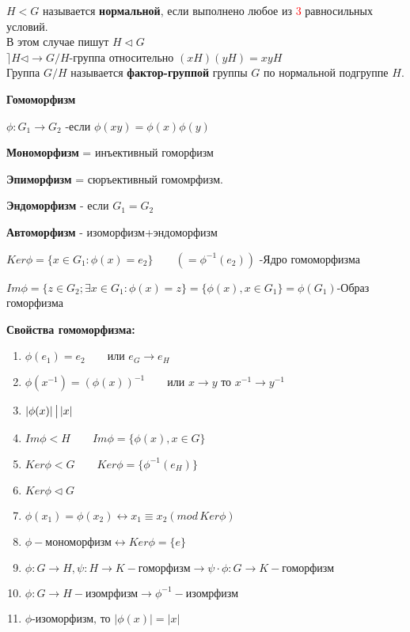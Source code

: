 \documentclass[12pt]{article}
\begin{document}
			
			$H<G$ называется \hypertarget{indef:norm_gr}{\textbf{нормальной}}, если выполнено любое из \textcolor{red}{3} равносильных условий. \\
			В этом случае пишут $H\lhd G $\\		
			$\rceil H\lhd \rightarrow G/H$-группа относительно $(xH)(yH)=xyH$\\
			Группа $G/H$ называется \hypertarget{indef:fact_gr}{\textbf{фактор-группой}} группы $G$ по нормальной подгруппе $H$.
			
		
		
			\hypertarget{indef:morfizm}{\textbf{Гомоморфизм}} $\phi:G_1 \rightarrow G_2$ -если $\phi(xy)=\phi(x)\phi(y)$
			
			\textbf{Мономорфизм} = инъективный гоморфизм
			
			\textbf{Эпиморфизм} = сюръективный гомомрфизм.
			
			\textbf{Эндоморфизм} - если $G_1=G_2$
			
			\textbf{Автоморфизм} - изоморфизм+эндоморфизм
			
			$Ker\phi =\{x\in G_1 :\phi (x)=e_2\} \qquad (=\phi ^{-1}(e_2))$ -Ядро гомоморфизма
			
			$Im\phi =\{z\in G_2 ; \exists x\in G_1:\phi (x)=z\}=\{\phi (x), x\in G_1\}=\phi (G_1)$-Образ гоморфизма
			
			\hypertarget{inpro:gom}{\textbf{Свойства гомоморфизма:}}
				\begin{enumerate}
					\item $\phi (e_1)=e_2 \qquad \text{или } e_G \rightarrow e_H$
					\item $\phi (x^{-1})=(\phi (x))^{-1} \qquad \text{или } x\rightarrow y  \text{ то } x^{-1}\rightarrow y^{-1}$
					\item $| \phi (x)|\, \big{|} \, |x|$
					\item $Im\phi < H \qquad Im\phi=\{ \phi (x), x\in G \}$
					\item $Ker\phi <G  \qquad  Ker \phi=\{ \phi^{-1}(e_H) \}$
					\item $Ker\phi \lhd G$
					\item $\phi (x_1)=\phi (x_2) \leftrightarrow x_1 \equiv x_2 (mod \, Ker\phi) $
					\item $\phi- \text{мономорфизм}\leftrightarrow Ker \phi =\{e\} $
					\item $\phi :G \rightarrow H, \psi :H\rightarrow K -\text{гоморфизм} \rightarrow \psi \cdot \phi : G \rightarrow K - \text{гоморфизм}$
					\item $\phi :G\rightarrow H-\text{изомрфизм} \rightarrow \phi^{-1}-\text{изомрфизм} $
					\item $\phi \text{-изоморфизм, то } |\phi (x)|=|x|$
				\end{enumerate}
				
\end{document}
